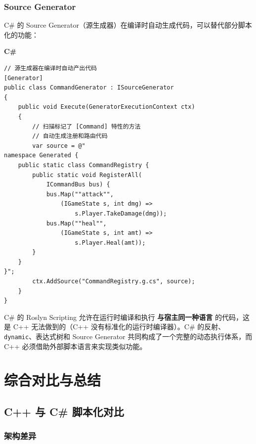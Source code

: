 \documentclass[12pt,a4paper,fontset=fandol]{ctexbook}
\newenvironment{compare}[1][]{%
  \begin{tcolorbox}[enhanced,breakable,
    colback=green!3!white,colframe=green!50!black,
    boxed title style={colback=green!50!black},
    attach boxed title to top left={yshift=-2mm,xshift=2mm},
    arc=2mm,boxrule=0.8mm,
    title={方案对比},#1]}%
  {\end{tcolorbox}}
\newcommand{\Tp}[1]{\texttt{#1}}
\newcommand{\csharplabel}{%
  \noindent\begin{tcolorbox}[colback=csharpheadbg,coltext=white,
    sharp corners,boxrule=0pt,width=3.2em,height=1.4em,
    halign=center,valign=center,nobeforeafter,left=0pt,right=0pt,
    top=0pt,bottom=0pt]\small\bfseries C\#\end{tcolorbox}}
\begin{document}
\section{Source Generator}\label{sec:source-gen}

C\# 的 Source Generator（源生成器）在编译时自动生成代码，可以替代部分脚本化的功能：

\csharplabel
\begin{lstlisting}[style=csharpstyle]
// 源生成器在编译时自动产出代码
[Generator]
public class CommandGenerator : ISourceGenerator
{
    public void Execute(GeneratorExecutionContext ctx)
    {
        // 扫描标记了 [Command] 特性的方法
        // 自动生成注册和路由代码
        var source = @"
namespace Generated {
    public static class CommandRegistry {
        public static void RegisterAll(
            ICommandBus bus) {
            bus.Map(""attack"",
                (IGameState s, int dmg) =>
                    s.Player.TakeDamage(dmg));
            bus.Map(""heal"",
                (IGameState s, int amt) =>
                    s.Player.Heal(amt));
        }
    }
}";
        ctx.AddSource("CommandRegistry.g.cs", source);
    }
}
\end{lstlisting}

\begin{compare}[title={C\# 脚本化能力 vs C++ 脚本集成}]
C\# 的 Roslyn Scripting 允许在运行时编译和执行 \textbf{与宿主同一种语言} 的代码，这是 C++ 无法做到的（C++ 没有标准化的运行时编译器）。C\# 的反射、\Tp{dynamic}、表达式树和 Source Generator 共同构成了一个完整的动态执行体系，而 C++ 必须借助外部脚本语言来实现类似功能。
\end{compare}


\part{综合对比与总结}

\chapter{C++ 与 C\# 脚本化对比}\label{ch:cpp-vs-csharp}

\section{架构差异}\label{sec:arch-diff}
\end{document}
